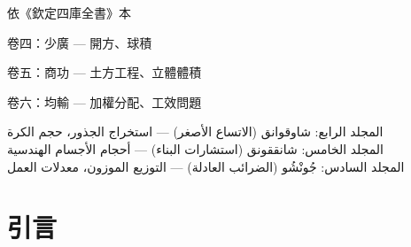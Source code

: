 \documentclass[11pt,a4paper]{article}
\begin{document}
\begin{titlepage}
\begin{center}
\vspace{1.5cm}

\vfill

{\small 依《欽定四庫全書》本}

\vspace{0.2cm}

{\small\color{notecolor} 卷四：少廣 --- 開方、球積}

{\small\color{notecolor} 卷五：商功 --- 土方工程、立體體積}

{\small\color{notecolor} 卷六：均輸 --- 加權分配、工效問題}

\vspace{0.3cm}

{\small\arabicfont\beginR\color{notecolor}
المجلد الرابع: شاوقوانق (الاتساع الأصغر) --- استخراج الجذور، حجم الكرة\\
المجلد الخامس: شانققونق (استشارات البناء) --- أحجام الأجسام الهندسية\\
المجلد السادس: جُونْشُو (الضرائب العادلة) --- التوزيع الموزون، معدلات العمل
\endR}

\end{center}
\end{titlepage}

\tableofcontents
\newpage

\section*{引言}
\end{document}

